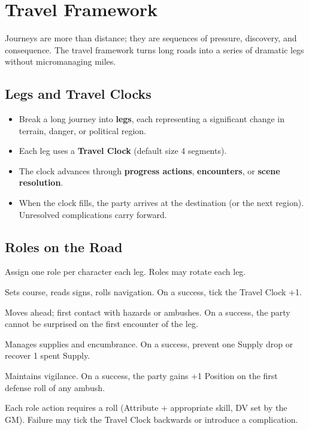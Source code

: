 \section{Travel Framework}
\label{sec:travel}

Journeys are more than distance; they are sequences of pressure, discovery, and consequence. The travel framework turns long roads into a series of dramatic legs without micromanaging miles.

\subsection{Legs and Travel Clocks}
\begin{itemize}
  \item Break a long journey into \textbf{legs}, each representing a significant change in terrain, danger, or political region.
  \item Each leg uses a \textbf{Travel Clock} (default size 4 segments).
  \item The clock advances through \textbf{progress actions}, \textbf{encounters}, or \textbf{scene resolution}.
  \item When the clock fills, the party arrives at the destination (or the next region). Unresolved complications carry forward.
\end{itemize}

\subsection{Roles on the Road}
Assign one role per character each leg. Roles may rotate each leg.
\begin{description}[leftmargin=1.5em, style=nextline]
  \item[Guide:] Sets course, reads signs, rolls navigation. On a success, tick the Travel Clock +1.
  \item[Scout:] Moves ahead; first contact with hazards or ambushes. On a success, the party cannot be surprised on the first encounter of the leg.
  \item[Quartermaster:] Manages supplies and encumbrance. On a success, prevent one Supply drop or recover 1 spent Supply.
  \item[Watch:] Maintains vigilance. On a success, the party gains +1 Position on the first defense roll of any ambush.
\end{description}
Each role action requires a roll (Attribute + appropriate skill, DV set by the GM). Failure may tick the Travel Clock backwards or introduce a complication.

